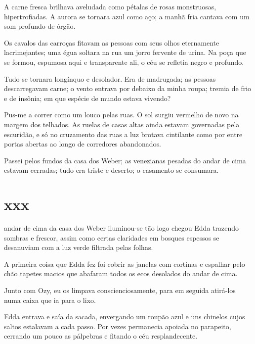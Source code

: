 A carne fresca brilhava aveludada como pétalas de rosas monstruosas,
hipertrofiadas. A aurora se tornara azul como aço; a manhã fria cantava com
um som profundo de órgão.

Os cavalos das carroças fitavam as pessoas com seus olhos eternamente
lacrimejantes; uma égua soltara na rua um jorro fervente de urina. Na poça
que se formou, espumosa aqui e transparente ali, o céu se refletia negro e
profundo.

Tudo se tornara longínquo e desolador. Era de madrugada; as pessoas
descarregavam carne; o vento entrava por debaixo da minha roupa; tremia de
frio e de insônia; em que espécie de mundo estava vivendo? 

Pus-me a correr como um louco pelas ruas. O sol surgiu vermelho de novo na
margem dos telhados. As ruelas de casas altas ainda estavam governadas pela
escuridão, e só no cruzamento das ruas a luz brotava cintilante como por
entre portas abertas ao longo de corredores abandonados.

Passei pelos fundos da casa dos Weber; as venezianas pesadas do andar de cima
estavam cerradas; tudo era triste e deserto; o casamento se consumara.


\section{xxx} 

andar de cima da casa dos Weber iluminou-se tão logo chegou Edda
 trazendo sombras e frescor, assim como certas claridades em bosques espessos
 se desanuviam com a luz verde filtrada pelas folhas.

A primeira coisa que Edda fez foi cobrir as janelas com cortinas e espalhar
pelo chão tapetes macios que abafaram todos os ecos desolados do andar de
cima.


Junto com Ozy, eu os limpava conscienciosamente, para em seguida atirá-los
numa caixa que ia para o lixo.

Edda entrava e saía da sacada, envergando um roupão azul e uns chinelos cujos
saltos estalavam a cada passo. Por vezes permanecia apoiada no parapeito,
cerrando um pouco as pálpebras e fitando o céu resplandecente.


